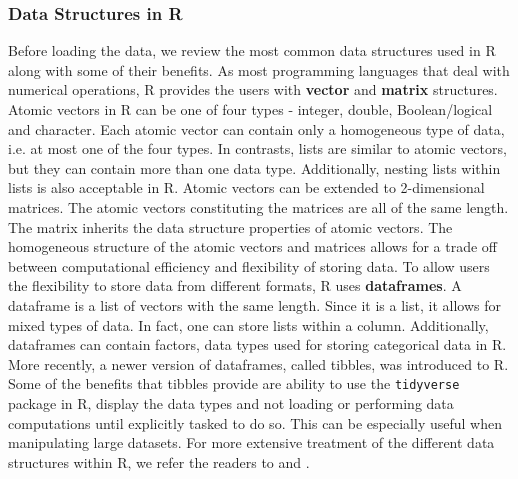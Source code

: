 \subsubsection{Data Structures in R}
Before loading the data, we review the most common data structures used in R along with some of their benefits. As most programming languages that deal with numerical operations, R provides the users with \textbf{vector} and \textbf{matrix} structures. Atomic vectors in R can be one of four types - integer, double, Boolean/logical and character. Each atomic vector can contain only a homogeneous type of data, i.e. at most one of the four types. In contrasts, lists are similar to atomic vectors, but they can contain more than one data type. Additionally, nesting lists within lists is also acceptable in R. Atomic vectors can be extended to 2-dimensional matrices. The atomic vectors constituting the matrices are all of the same length. The matrix inherits the data structure properties of atomic vectors. The homogeneous structure of the atomic vectors and matrices allows for a trade off between computational efficiency and flexibility of storing data. To allow users the flexibility to store data from different formats, R uses \textbf{dataframes}. A dataframe is a list of vectors with the same length. Since it is a list, it allows for mixed types of data. In fact, one can store lists within a column. Additionally, dataframes can contain factors, data types used for storing categorical data in R. More recently, a newer version of dataframes, called tibbles, was introduced to R. Some of the benefits that tibbles provide are ability to use the \verb|tidyverse| \cite{tidyverse} package in R, display the data types and not loading or performing data computations until explicitly tasked to do so. This can be especially useful when manipulating large datasets. For more extensive treatment of the different data structures within R, we refer the readers to \cite{tibble} and \cite{wickham2019advanced}.

